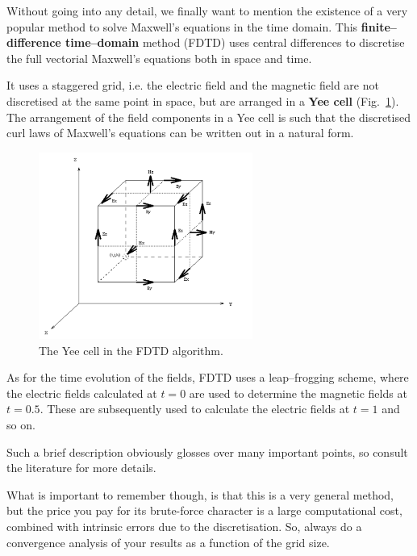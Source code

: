 
Without going into any detail, we finally want to mention the existence of a very popular method to solve Maxwell's equations in the time domain. This \textbf{finite--difference time--domain} method (FDTD) uses central differences to discretise the full vectorial Maxwell's equations both in space and time.

It uses a staggered grid, i.e. the electric field and the magnetic field are not discretised at the same point in space, but are arranged in a \textbf{Yee cell} (Fig.~\ref{fig-yee}). The arrangement of the field components in a Yee cell is such that the discretised curl laws of Maxwell's equations can be written out in a natural form.

\begin{figure}
\centering
\includegraphics[width=7cm]{numeric/figures/yeecell}
\caption{The Yee cell in the FDTD algorithm.}
\label{fig-yee}
\end{figure}

As for the time evolution of the fields, FDTD uses a leap--frogging scheme, where the electric fields calculated at $t=0$ are used to determine the magnetic fields at $t=0.5$. These are subsequently used to calculate the electric fields at $t=1$ and so on.

Such a brief description obviously glosses over many important points, so consult the literature for more details.

What is important to remember though, is that this is a very general method, but the price you pay for its brute-force character is a large computational cost, combined with intrinsic errors due to the discretisation. So, always do a convergence analysis of your results as a function of the grid size.

\pagebreak

